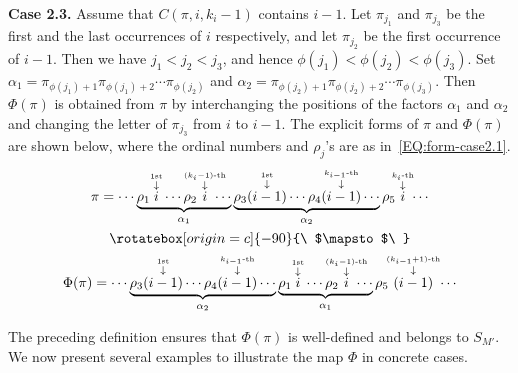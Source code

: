 \documentclass[11pt]{article}
\numberwithin{equation}{section}
\begin{document}
\noindent\textbf{Case 2.3.} Assume that $C(\pi,i,k_i-1)$ contains $i-1$. Let $\pi_{j_1}$ and $\pi_{j_3}$ be the first and the last occurrences of $i$ respectively, and let $\pi_{j_2}$ be the first occurrence of $i-1$. Then we have $j_1<j_2<j_3$, and hence $\phi(j_1)<\phi(j_2)<\phi(j_3)$. Set $\alpha_1=\pi_{\phi(j_1)+1}\pi_{\phi(j_1)+2}\cdots\pi_{\phi(j_2)}$ and $\alpha_2=\pi_{\phi(j_2)+1}\pi_{\phi(j_2)+2}\cdots\pi_{\phi(j_3)}$. Then $\Phi(\pi)$ is obtained from $\pi$ by interchanging the positions of the factors $\alpha_1$ and $\alpha_2$ and changing the letter of $\pi_{j_3}$ from $i$ to $i-1$. 
The explicit forms of $\pi$ and $\Phi(\pi)$ are shown below, where the ordinal numbers and $\rho_j$'s are as in~\eqref{EQ:form-case2.1}.
\begin{gather}
\pi=\cdots \underbrace{\rho_1
	\overset{\overset{\text{1st}}{\downarrow}}{i}
	\cdots
\rho_2
\mkern-17mu \overset{\overset{(k_i-1)\text{-th}}{\downarrow}}{i}\mkern-17mu
\cdots}_{\alpha_1}
\underbrace{\rho_3
	\overset{\overset{\text{1st}}{\downarrow}}{(i-1)}
	\cdots
\rho_4
\overset{\overset{k_{i-1}\text{-th}}{\downarrow}}{(i-1)}
\cdots}_{\alpha_2}
\rho_5
\mkern-5mu
\overset{\overset{k_i\text{-th}}{\downarrow}}{i}
\mkern-5mu
\cdots\nonumber\\
%
\rotatebox[origin=c]{-90}{\ $\mapsto$\ }\nonumber\\
%
\Phi(\pi)=\cdots \underbrace{\rho_3
	\overset{\overset{\text{1st}}{\downarrow}}{(i-1)}
	\cdots
\rho_4
\overset{\overset{k_{i-1}\text{-th}}{\downarrow}}{(i-1)}
\cdots
}_{\alpha_2}
\underbrace{\rho_1
	\overset{\overset{\text{1st}}{\downarrow}}{i}
	\cdots
\rho_2
\mkern-17mu
\overset{\overset{(k_{i}-1)\text{-th}}{\downarrow}}{i}
\mkern-17mu
\cdots
}_{\alpha_1}
\rho_5
\mkern-3mu
\overset{\overset{(k_{i-1}+1)\text{-th}}{\downarrow}}{(i-1)}
\mkern-3mu
\cdots\label{EQ:form-case2.3}
\end{gather}

The preceding definition ensures that $\Phi(\pi)$ is well-defined and belongs to $S_{M'}$. We now present several examples to illustrate the map $\Phi$ in concrete cases.
\end{document}
